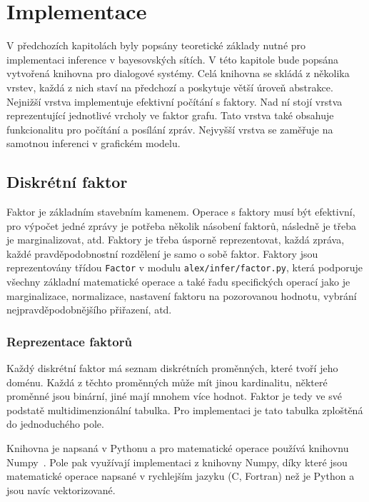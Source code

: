 \chapter{Implementace}
\label{ch:kap4}

V předchozích kapitolách byly popsány teoretické základy nutné pro implementaci inference v bayesovských sítích.
V této kapitole bude popsána vytvořená knihovna pro dialogové systémy.
Celá knihovna se skládá z několika vrstev, každá z nich staví na předchozí a poskytuje větší úroveň abstrakce.
Nejnižší vrstva implementuje efektivní počítání s faktory.
Nad ní stojí vrstva reprezentující jednotlivé vrcholy ve faktor grafu.
Tato vrstva také obsahuje funkcionalitu pro počítání a posílání zpráv.
Nejvyšší vrstva se zaměřuje na samotnou inferenci v grafickém modelu.

\section{Diskrétní faktor}

Faktor je základním stavebním kamenem.
Operace s faktory musí být efektivní, pro výpočet jedné zprávy je potřeba několik násobení faktorů, následně je třeba je marginalizovat, atd.
Faktory je třeba úsporně reprezentovat, každá zpráva, každé pravděpodobnostní rozdělení je samo o sobě faktor.
Faktory jsou reprezentovány třídou \texttt{Factor} v modulu \texttt{alex/infer/factor.py}, která podporuje všechny základní matematické operace a také řadu specifických operací jako je marginalizace, normalizace, nastavení faktoru na pozorovanou hodnotu, vybrání nejpravděpodobnějšího přiřazení, atd.

\subsection{Reprezentace faktorů}
\label{sec:repfak}

Každý diskrétní faktor má seznam diskrétních proměnných, které tvoří jeho doménu.
Každá z těchto proměnných může mít jinou kardinalitu, některé proměnné jsou binární, jiné mají mnohem více hodnot.
Faktor je tedy ve své podstatě multidimenzionální tabulka.
Pro implementaci je tato tabulka zploštěná do jednoduchého pole.

Knihovna je napsaná v Pythonu a pro matematické operace používá knihovnu Numpy~\cite{oliphant-2006-guide}.
Pole pak využívají implementaci z knihovny Numpy, díky které jsou matematické operace napsané v rychlejším jazyku (C, Fortran) než je Python a jsou navíc vektorizované.

